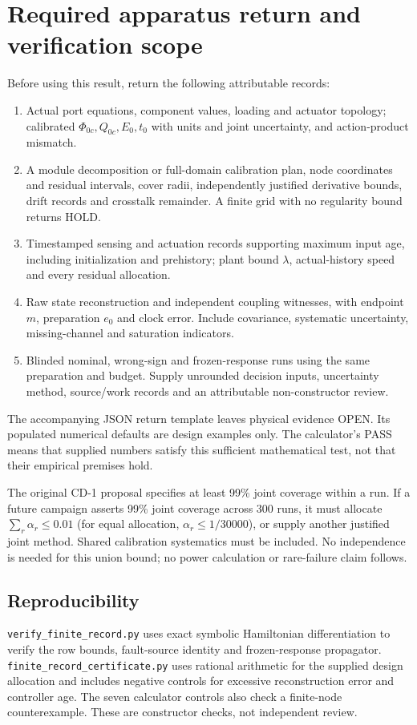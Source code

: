 \documentclass[10pt,a4paper]{article}
\begin{document}
\section{Required apparatus return and verification scope}
Before using this result, return the following attributable records:
\begin{enumerate}[leftmargin=*,itemsep=3pt]
\item Actual port equations, component values, loading and actuator topology; calibrated $\Phi_{0c},Q_{0c},E_0,t_0$ with units and joint uncertainty, and action-product mismatch.
\item A module decomposition or full-domain calibration plan, node coordinates and residual intervals, cover radii, independently justified derivative bounds, drift records and crosstalk remainder. A finite grid with no regularity bound returns HOLD.
\item Timestamped sensing and actuation records supporting maximum input age, including initialization and prehistory; plant bound $\lambda$, actual-history speed and every residual allocation.
\item Raw state reconstruction and independent coupling witnesses, with endpoint $m$, preparation $e_0$ and clock error. Include covariance, systematic uncertainty, missing-channel and saturation indicators.
\item Blinded nominal, wrong-sign and frozen-response runs using the same preparation and budget. Supply unrounded decision inputs, uncertainty method, source/work records and an attributable non-constructor review.
\end{enumerate}
The accompanying JSON return template leaves physical evidence OPEN. Its populated numerical defaults are design examples only. The calculator's PASS means that supplied numbers satisfy this sufficient mathematical test, not that their empirical premises hold.

The original CD-1 proposal specifies at least 99\% joint coverage within a run. If a future campaign asserts 99\% joint coverage across 300 runs, it must allocate $\sum_r\alpha_r\leq0.01$ (for equal allocation, $\alpha_r\leq1/30000$), or supply another justified joint method. Shared calibration systematics must be included. No independence is needed for this union bound; no power calculation or rare-failure claim follows.

\subsection*{Reproducibility}
\texttt{verify\_finite\_record.py} uses exact symbolic Hamiltonian differentiation to verify the row bounds, fault-source identity and frozen-response propagator. \texttt{finite\_record\_certificate.py} uses rational arithmetic for the supplied design allocation and includes negative controls for excessive reconstruction error and controller age. The seven calculator controls also check a finite-node counterexample. These are constructor checks, not independent review.
\end{document}
